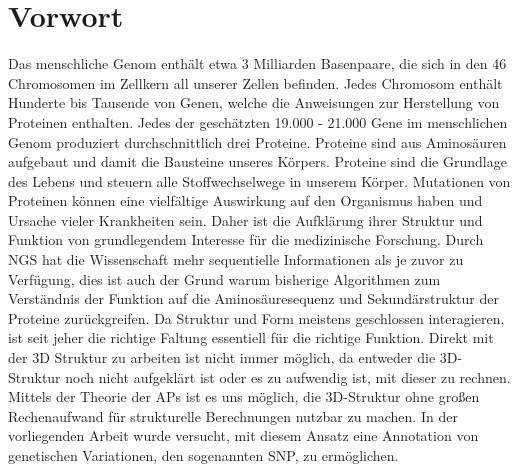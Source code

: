 \chapter{Vorwort}

Das menschliche Genom enthält etwa 3 Milliarden Basenpaare, die sich in den 46 Chromosomen im Zellkern all unserer Zellen befinden. Jedes Chromosom enthält Hunderte bis Tausende von Genen, welche die Anweisungen zur Herstellung von Proteinen enthalten. Jedes der geschätzten 19.000 - 21.000 Gene\cite{Ezkurdia.2014} im menschlichen Genom produziert durchschnittlich drei Proteine. Proteine sind aus Aminosäuren aufgebaut und damit die Bausteine unseres Körpers. Proteine sind die Grundlage des Lebens und steuern alle Stoffwechselwege in unserem Körper. Mutationen von Proteinen können eine vielfältige Auswirkung auf den Organismus haben und Ursache vieler Krankheiten sein. Daher ist die Aufklärung ihrer Struktur und Funktion von grundlegendem Interesse für die medizinische Forschung. 
Durch \ac{NGS} hat die Wissenschaft mehr sequentielle Informationen als je zuvor zu Verfügung, dies ist auch der Grund warum bisherige Algorithmen zum Verständnis der Funktion auf die Aminosäuresequenz und Sekundärstruktur der Proteine zurückgreifen. Da Struktur und Form meistens geschlossen interagieren, ist seit jeher die richtige Faltung essentiell für die richtige Funktion. Direkt mit der 3D Struktur zu arbeiten ist nicht immer möglich, da entweder die 3D-Struktur noch nicht aufgeklärt ist oder es zu aufwendig ist, mit dieser zu rechnen.
Mittels der Theorie der \ac{APs} ist es uns möglich, die 3D-Struktur ohne großen Rechenaufwand für strukturelle Berechnungen nutzbar zu machen. In der vorliegenden Arbeit wurde versucht, mit diesem Ansatz eine Annotation von genetischen Variationen, den sogenannten \ac{SNP}, zu ermöglichen.

